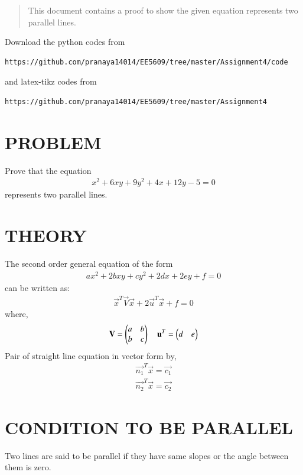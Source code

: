 \documentclass[journal,12pt,twocolumn]{IEEEtran}
\begin{document}
%
\begin{abstract}
This document contains a proof to show the given equation represents two parallel lines. 
\end{abstract}
Download the python codes from 
%
\begin{lstlisting}
https://github.com/pranaya14014/EE5609/tree/master/Assignment4/code
\end{lstlisting}
%
and latex-tikz codes from 
%
\begin{lstlisting}
https://github.com/pranaya14014/EE5609/tree/master/Assignment4
\end{lstlisting}
%
\section{PROBLEM}
Prove that the equation
\begin{align} 
    x^{2}+6xy+9y^{2}+4x+12y-5=0 \label{eq:0}
\end{align}
represents two parallel lines.
\section{THEORY}
The second order general equation of the form
\begin{align} 
	ax^2 + 2bxy + cy^2 + 2dx + 2ey + f = 0 
\end{align}
can be written as:
\begin{align}
    \vec{x}^T\vec{V}\vec{x} +2\vec{u}^T\vec{x}+f=0 \label{eq:1}
\end{align}
where,
\begin{align}
 \mathbf{V}= \begin{pmatrix}a &b\\b&c\end{pmatrix}\quad \mathbf{u}^T = \begin{pmatrix}d &e\end{pmatrix}
\end{align}
Pair of straight line equation in vector form  by,
\begin{align}
\vec{n_1}^T\vec{x}= \vec{c_1}\label{eq:2}\\
\vec{n_2}^T\vec{x} = \vec{c_2}\label{eq:3}
\end{align}
\section{CONDITION TO BE PARALLEL}
Two lines are said to be parallel if they have same slopes or the angle between them is zero.
\end{document}
